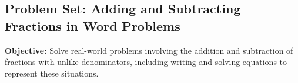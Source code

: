 \documentclass[12pt]{article}
\title{}
\date{}
\begin{document}
\subsection*{Problem Set: Adding and Subtracting Fractions in Word Problems}
\onehalfspacing

\begin{tcolorbox}[colframe=black!40, colback=gray!5, 
coltitle=black, colbacktitle=black!20, fonttitle=\bfseries\Large, 
title=Learning Objective, halign title=center, left=5pt, right=5pt, top=5pt, bottom=15pt]
\textbf{Objective:} Solve real-world problems involving the addition and subtraction of fractions with unlike denominators, including writing and solving equations to represent these situations.
\end{tcolorbox}

\end{document}
